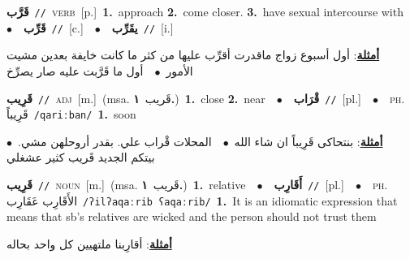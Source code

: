 \documentclass[10pt,a4paper,twoside]{article} %
\begin{document}
\begin{multicols}{2}
{\setlength\topsep{0pt}\textbf{\foreignlanguage{arabic}{قَرَّب}}\ {\color{gray}\texttt{//}\color{black}}\ \textsc{verb}\ [p.]\ \textbf{1.}~approach  \textbf{2.}~come closer.  \textbf{3.}~have sexual intercourse with\ \ $\bullet$\ \ \setlength\topsep{0pt}\textbf{\foreignlanguage{arabic}{قَرِّب}}\ {\color{gray}\texttt{//}\color{black}}\ [c.]\ \ $\bullet$\ \ \setlength\topsep{0pt}\textbf{\foreignlanguage{arabic}{يقَرِّب}}\ {\color{gray}\texttt{//}\color{black}}\ [i.]\  \begin{flushright}\color{gray}\foreignlanguage{arabic}{\textbf{\underline{\foreignlanguage{arabic}{أمثلة}}}: أول أسبوع زواج ماقدرت أقرِّب عليها من كثر ما كانت خايفة بعدين مشيت الأمور\ $\bullet$\ \  أول ما قَرَّبت عليه صار يصرِّخ}\end{flushright}\color{black}} \vspace{2mm}

{\setlength\topsep{0pt}\textbf{\foreignlanguage{arabic}{قَرِيب}}\ {\color{gray}\texttt{//}\color{black}}\ \textsc{adj}\ [m.]\ \color{gray}(msa. \foreignlanguage{arabic}{قَريب}~\foreignlanguage{arabic}{\textbf{١.}})\color{black}\ \textbf{1.}~close  \textbf{2.}~near\ \ $\bullet$\ \ \setlength\topsep{0pt}\textbf{\foreignlanguage{arabic}{قْرَاب}}\ {\color{gray}\texttt{//}\color{black}}\ [pl.]\ \ $\bullet$\ \ \textsc{ph.} \color{gray} \foreignlanguage{arabic}{قَرِيباً}\color{black}\ {\color{gray}\texttt{/{\sffamily qariːban}/}\color{black}}\ \textbf{1.}~soon\  \begin{flushright}\color{gray}\foreignlanguage{arabic}{\textbf{\underline{\foreignlanguage{arabic}{أمثلة}}}: بنتحاكى قَرِيباً ان شاء الله\ $\bullet$\ \  المحلات قْراب علي. بقدر أروحلهن مشي.\ $\bullet$\ \  بيتكم الجديد قَريب كثير عشغلي}\end{flushright}\color{black}} \vspace{2mm}

{\setlength\topsep{0pt}\textbf{\foreignlanguage{arabic}{قَرِيب}}\ {\color{gray}\texttt{//}\color{black}}\ \textsc{noun}\ [m.]\ \color{gray}(msa. \foreignlanguage{arabic}{قَريب}~\foreignlanguage{arabic}{\textbf{١.}})\color{black}\ \textbf{1.}~relative\ \ $\bullet$\ \ \setlength\topsep{0pt}\textbf{\foreignlanguage{arabic}{أَقَارِب}}\ {\color{gray}\texttt{//}\color{black}}\ [pl.]\ \ $\bullet$\ \ \textsc{ph.} \color{gray} \foreignlanguage{arabic}{الأَقَارِب عَقَارِب}\color{black}\ {\color{gray}\texttt{/{\sffamily ʔilʔaqaːrib ʕaqaːrib}/}\color{black}}\ \textbf{1.}~It is an idiomatic expression that means that sb's relatives are wicked and the person should not trust them\  \begin{flushright}\color{gray}\foreignlanguage{arabic}{\textbf{\underline{\foreignlanguage{arabic}{أمثلة}}}: أقارِبنا ملتهيين كل واحد بحاله}\end{flushright}\color{black}} \vspace{2mm}


\end{multicols}
\end{document}
